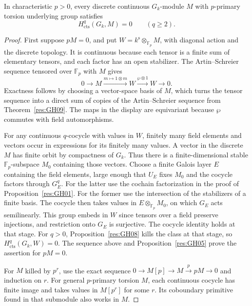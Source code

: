 \begin{theorem}
\label{res:GH10}
In characteristic \(p>0\), every discrete continuous \(G_k\)-module
\(M\) with \(p\)-primary torsion underlying group satisfies
\[
 H^q_{\mathrm{cts}}(G_k,M)=0\qquad(q\geq2).
\]
\end{theorem}
\begin{proof}
First suppose \(pM=0\), and put
\(W=k^{\mathrm s}\otimes_{\mathbb F_p}M\), with diagonal action and
the discrete topology. It is continuous because each tensor is a
finite sum of elementary tensors, and each factor has an open
stabilizer. The Artin--Schreier sequence tensored over \(\mathbb F_p\)
with \(M\) gives
\[
 0\longrightarrow M\xrightarrow{m\mapsto 1\otimes m}W
 \xrightarrow{\wp\otimes 1}W\longrightarrow0.
\]
Exactness follows by choosing a vector-space basis of \(M\), which
turns the tensor sequence into a direct sum of copies of the
Artin--Schreier sequence from Theorem~\ref{res:GH09}. The maps in the
display are equivariant because \(\wp\) commutes with field
automorphisms.

For any continuous \(q\)-cocycle with values in \(W\), finitely
many field elements and vectors occur in expressions for its
finitely many values. A vector in the discrete \(M\) has finite
orbit by compactness of \(G_k\). Thus there is a finite-dimensional
stable \(\mathbb F_p\)-subspace \(M_0\) containing those vectors.
Choose a finite Galois layer \(E\) containing the field elements,
large enough that \(U_E\) fixes \(M_0\) and the cocycle factors
through \(G_E^q\). For the latter use the cochain factorization in
the proof of Proposition~\ref{res:GH01}. For the former use the
intersection of the stabilizers of a finite basis. The cocycle
then takes values in \(E\otimes_{\mathbb F_p} M_0\), on which
\(G_E\) acts semilinearly. This group embeds in \(W\) since tensors
over a field preserve injections, and restriction onto \(G_E\)
is surjective. The cocycle identity holds at that stage. For
\(q>0\), Proposition~\ref{res:GH08} kills the class at that stage,
so \(H^q_{\mathrm{cts}}(G_k,W)=0\). The sequence above and
Proposition~\ref{res:GH05} prove the assertion for \(pM=0\).

For \(M\) killed by \(p^r\), use the exact sequence
\(0\to M[p]\to M\xrightarrow{p}pM\to0\) and induction on \(r\).
For general \(p\)-primary torsion \(M\), each continuous cocycle
has finite image and takes values in \(M[p^r]\) for some \(r\).
Its coboundary primitive found in that submodule also works in \(M\).
\end{proof}

